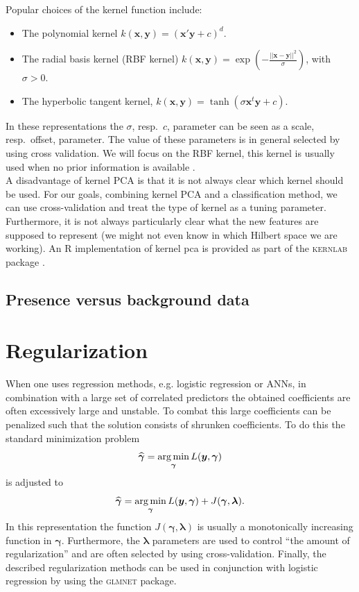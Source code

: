 Popular choices of the kernel function include:
\begin{itemize}
\item The polynomial kernel $k(\bm{x},\bm{y}) = (\bm{x}' \bm{y} + c)^d$.
\item The radial basis kernel (RBF kernel) $k(\bm{x},\bm{y}) = \exp{(-\frac{\vert \vert \bm{x} -\bm{y}\vert \vert ^2}{\sigma})}$, with $\sigma > 0$. 
\item The hyperbolic tangent kernel, $k(\bm{x},\bm{y}) = \tanh{(\sigma \bm{x}^t \bm{y} + c)}$.
\end{itemize}
In these representations the $\sigma$, resp.\ $c$, parameter can be seen as a scale, resp.\ offset, parameter. The value of these parameters is in general selected by using cross validation. We will focus on the RBF kernel, this kernel is usually used when no prior information is available \parencite{JSSv011i09}.  \\

A disadvantage of kernel PCA is that it is not always clear which kernel should be used. For our goals, combining kernel PCA and a classification method, we can use cross-validation and treat the type of kernel as a tuning parameter. Furthermore, it is not always particularly clear what the new features are supposed to represent (we might not even know in which Hilbert space we are working). An R implementation of kernel pca is provided as part of the \textsc{kernlab} package \parencite{JSSv011i09}.

\subsection{Presence versus background data}
\label{sec:dimRedPrVSBG}


\section{Regularization}
\label{sec:Regularization}
When one uses regression methods, e.g. logistic regression or ANNs, in combination with a large set of correlated predictors the obtained coefficients are often excessively large and unstable. To combat this large coefficients can be penalized such that the solution consists of shrunken coefficients. To do this the standard minimization problem
\[\widehat{\bm{\gamma}} = \operatorname*{arg\,min}_{\bm{\gamma}} L(\bm{y},\bm{\gamma})\]
is adjusted to \[\widehat{\bm{\gamma}} = \operatorname*{arg\,min}_{\bm{\gamma}} L(\bm{y},\bm{\gamma}) + J(\bm{\gamma},\bm{\lambda}).\]
In this representation the function $ J(\bm{\gamma},\bm{\lambda})$ is usually a monotonically increasing function in $\bm{\gamma}$. Furthermore, the $\bm{\lambda}$ parameters are used to control ``the amount of regularization'' and are often selected by using cross-validation. Finally, the described regularization methods can be used in conjunction with logistic regression by using the \textsc{glmnet} \parencite{glmnet} package.

